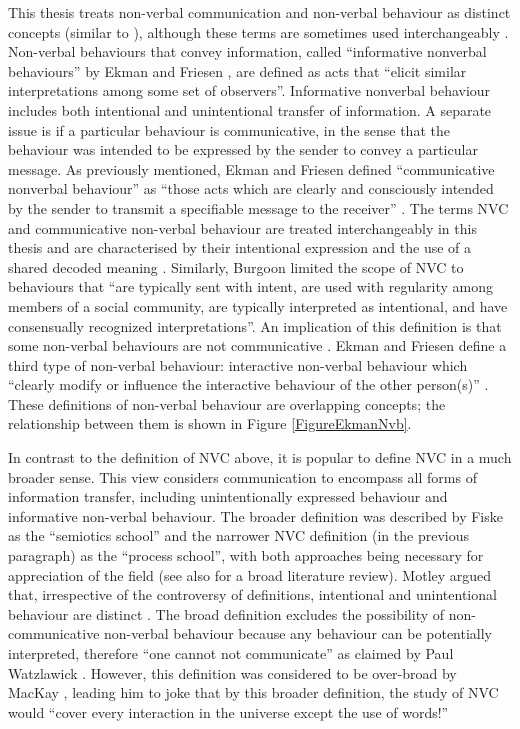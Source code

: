 This thesis treats non-verbal communication and non-verbal behaviour as distinct concepts (similar to \cite{Krauss1996, Hall2012}), although these terms are sometimes used interchangeably \cite{Negi2009}. Non-verbal behaviours that convey information, called ``informative nonverbal behaviours'' by Ekman and Friesen \cite{Ekman1969}, are defined as acts that ``elicit similar interpretations among some set of observers''. Informative nonverbal behaviour includes both intentional and unintentional transfer of information. A separate issue is if a particular behaviour is communicative, in the sense that the behaviour was intended to be expressed by the sender to convey a particular message. As previously mentioned, Ekman and Friesen defined ``communicative nonverbal behaviour'' as ``those acts which are clearly and consciously intended by the sender to transmit a specifiable message to the receiver'' \cite{Ekman1969}. The terms \ac{NVC} and communicative non-verbal behaviour are treated interchangeably in this thesis and are characterised by their intentional expression \cite{Hall2012, Ekman1969, Lehtonen1981} and the use of a shared decoded meaning \cite{Hall2012, Ekman1969, Lehtonen1981, Wiener1972}. Similarly, Burgoon \etal \cite{Burgoon1996} limited the scope of \ac{NVC} to behaviours that ``are typically sent with intent, are used with regularity among members of a social community, are typically interpreted as intentional, and have consensually recognized interpretations''. An implication of this definition is that some non-verbal behaviours are not communicative \cite{Ekman1969, Engle1998}. Ekman and Friesen define a third type of non-verbal behaviour: interactive non-verbal behaviour which ``clearly modify or influence the interactive behaviour of the other person(s)'' \cite{Ekman1969}. These definitions of non-verbal behaviour are overlapping concepts; the relationship between them is shown in Figure \ref{FigureEkmanNvb}.

In contrast to the definition of \ac{NVC} above, it is popular to define \ac{NVC} in a much broader sense. This view considers communication to encompass all forms of information transfer, including unintentionally expressed behaviour and informative non-verbal behaviour. The broader definition was described by Fiske \cite{Fiske2010} as the ``semiotics school'' and the narrower \ac{NVC} definition (in the previous paragraph) as the ``process school'', with both approaches being necessary for appreciation of the field (see also \cite{Rozelle2006} for a broad literature review). Motley argued that, irrespective of the controversy of definitions, intentional and unintentional behaviour are distinct \cite{Motley1986}. The broad definition excludes the possibility of non-communicative non-verbal behaviour because any behaviour can be potentially interpreted, therefore ``one cannot not communicate'' as claimed by Paul Watzlawick \cite{Andersen1991}. However, this definition was considered to be over-broad by MacKay \cite{MacKay1972}, leading him to joke that by this broader definition, the study of \ac{NVC} would ``cover every interaction in the universe except the use of words!''

